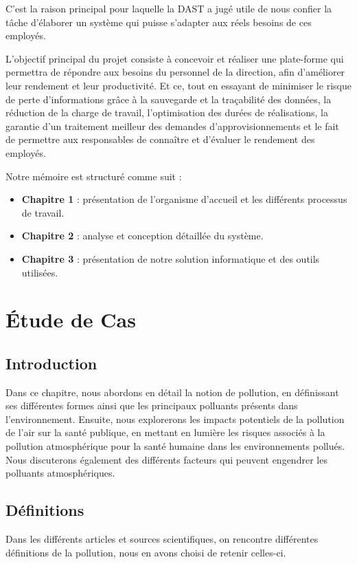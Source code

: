 \documentclass{report}
\begin{document}
C’est la raison principal pour laquelle la DAST a jugé utile de nous confier la tâche d’élaborer un système qui puisse s’adapter aux réels besoins de ces employés.

L’objectif principal du projet consiste à concevoir et réaliser une plate-forme qui permettra de répondre aux besoins du personnel de la direction, afin d’améliorer leur rendement et leur productivité. Et ce, tout en essayant de minimiser le risque de perte d'informations grâce à la sauvegarde et la traçabilité des données, la réduction de la charge de travail, l'optimisation des durées de réalisations, la garantie d'un traitement meilleur des demandes d’approvisionnements et le fait de permettre aux responsables de connaître et d’évaluer le rendement des employés.

Notre mémoire est structuré comme suit :
\begin{itemize}
    \item \textbf{Chapitre 1} : présentation de l'organisme d’accueil et les différents processus de travail.
    \item \textbf{Chapitre 2} : analyse et conception détaillée du système.
    \item \textbf{Chapitre 3} : présentation de notre solution informatique et des outils utilisées. 
\end{itemize}


\chapter{Étude de Cas}
\newpage 
\section{Introduction}
Dans ce chapitre, nous abordons en détail la notion de pollution, en définissant ses différentes formes ainsi que les principaux polluants présents dans l'environnement. Ensuite, nous explorerons les impacts potentiels de la pollution de l'air sur la santé publique, en mettant en lumière les risques associés à la pollution atmosphérique pour la santé humaine dans les environnements pollués. Nous discuterons également des différents facteurs qui peuvent engendrer les polluants atmosphériques.

\section{Définitions}

Dans les différents articles et sources scientifiques, on rencontre différentes définitions de la pollution, nous en avons choisi de retenir celles-ci.
\end{document}

